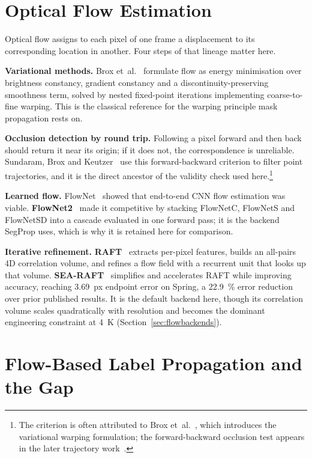 \documentclass[report.tex]{subfiles}
\begin{document}
\section{Optical Flow Estimation}
\label{sec:sota-flow}

Optical flow assigns to each pixel of one frame a displacement to its
corresponding location in another. Four steps of that lineage matter here.

\textbf{Variational methods.} Brox et~al.~\cite{brox2004} formulate flow as
energy minimisation over brightness constancy, gradient constancy and a
discontinuity-preserving smoothness term, solved by nested fixed-point
iterations implementing coarse-to-fine warping. This is the classical reference
for the warping principle mask propagation rests on.

\textbf{Occlusion detection by round trip.} Following a pixel forward and then
back should return it near its origin; if it does not, the correspondence is
unreliable. Sundaram, Brox and Keutzer~\cite{sundaram2010} use this
forward-backward criterion to filter point trajectories, and it is the direct
ancestor of the validity check used here.\footnote{The criterion is often
attributed to Brox et~al.~\cite{brox2004}, which introduces the variational
warping formulation; the forward-backward occlusion test appears in the later
trajectory work~\cite{sundaram2010}.}

\textbf{Learned flow.} FlowNet~\cite{dosovitskiy2015} showed that end-to-end
CNN flow estimation was viable. \textbf{FlowNet2}~\cite{flownet2_2017} made it
competitive by stacking FlowNetC, FlowNetS and FlowNetSD into a cascade
evaluated in one forward pass; it is the backend SegProp uses, which is why it
is retained here for comparison.

\textbf{Iterative refinement.} \textbf{RAFT}~\cite{raft2020} extracts per-pixel
features, builds an all-pairs 4D correlation volume, and refines a flow field
with a recurrent unit that looks up that volume.
\textbf{SEA-RAFT}~\cite{searaft2024} simplifies and accelerates RAFT while
improving accuracy, reaching \SI{3.69}{px} endpoint error on Spring, a
\SI{22.9}{\percent} error reduction over prior published results. It is the
default backend here, though its correlation volume scales quadratically with
resolution and becomes the dominant engineering constraint at \SI{4}{K}
(Section~\ref{sec:flowbackends}).

\section{Flow-Based Label Propagation and the Gap}
\label{sec:sota-prop}
\end{document}
